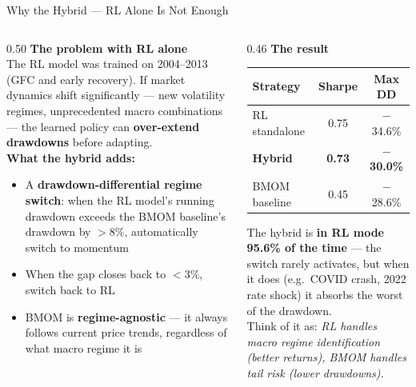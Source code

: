 \documentclass[aspectratio=169,11pt]{beamer}
\begin{document}

\begin{frame}{Why the Hybrid --- RL Alone Is Not Enough}
  \begin{columns}[T]
    \begin{column}{0.50\textwidth}
      \textbf{The problem with RL alone}\\[0.4em]
      \normalsize
      The RL model was trained on 2004--2013 (GFC and early recovery). If market dynamics shift significantly --- new volatility regimes, unprecedented macro combinations --- the learned policy can \textbf{over-extend drawdowns} before adapting.\\[0.6em]
      \textbf{What the hybrid adds:}
      \begin{itemize}\normalsize
        \setlength\itemsep{0.4em}
        \item A \textbf{drawdown-differential regime switch}: when the RL model's running drawdown exceeds the BMOM baseline's drawdown by $>8\%$, automatically switch to momentum
        \item When the gap closes back to $<3\%$, switch back to RL
        \item BMOM is \textbf{regime-agnostic} --- it always follows current price trends, regardless of what macro regime it is
      \end{itemize}
    \end{column}
    \begin{column}{0.46\textwidth}
      \textbf{The result}\\[0.4em]
      \begin{center}\small
      \begin{tabular}{lcc}
        \toprule
        Strategy & Sharpe & Max DD \\
        \midrule
        RL standalone & 0.75 & $-$34.6\% \\
        \rowcolor{green!8}
        \textbf{Hybrid} & \textbf{0.73} & $\mathbf{-}$\textbf{30.0\%} \\
        BMOM baseline  & 0.45 & $-$28.6\% \\
        \bottomrule
      \end{tabular}
      \end{center}
      \vspace{0.5em}
      \normalsize
      The hybrid is \textbf{in RL mode 95.6\% of the time} --- the switch rarely activates, but when it does (e.g.\ COVID crash, 2022 rate shock) it absorbs the worst of the drawdown.\\[0.5em]
      \small
      Think of it as: \textit{RL handles macro regime identification (better returns), BMOM handles tail risk (lower drawdowns).}
    \end{column}
  \end{columns}
\end{frame}
\end{document}
